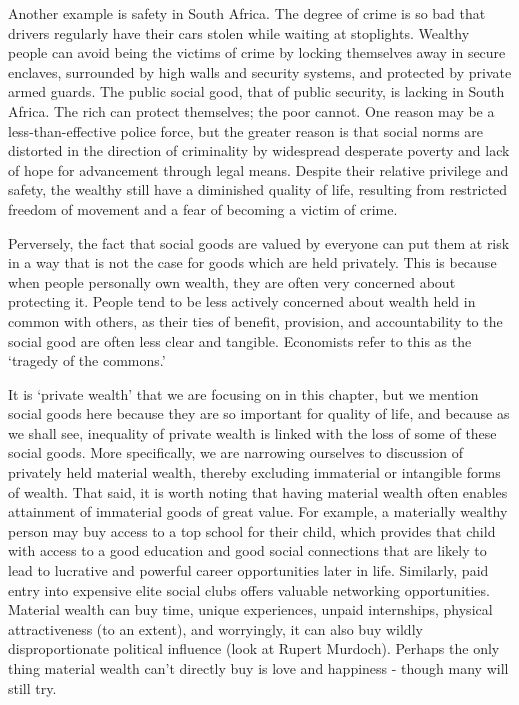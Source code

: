 \documentclass[]{tufte-handout}
\begin{document}
Another example is safety in South Africa. The degree of crime is so bad
that drivers regularly have their cars stolen while waiting at
stoplights. Wealthy people can avoid being the victims of crime by
locking themselves away in secure enclaves, surrounded by high walls and
security systems, and protected by private armed guards. The public
social good, that of public security, is lacking in South Africa. The
rich can protect themselves; the poor cannot. One reason may be a
less-than-effective police force, but the greater reason is that social
norms are distorted in the direction of criminality by widespread
desperate poverty and lack of hope for advancement through legal means.
Despite their relative privilege and safety, the wealthy still have a
diminished quality of life, resulting from restricted freedom of
movement and a fear of becoming a victim of crime.

Perversely, the fact that social goods are valued by everyone can put
them at risk in a way that is not the case for goods which are held
privately. This is because when people personally own wealth, they are
often very concerned about protecting it. People tend to be less
actively concerned about wealth held in common with others, as their
ties of benefit, provision, and accountability to the social good are
often less clear and tangible. Economists refer to this as the `tragedy
of the commons.'

It is `private wealth' that we are focusing on in this chapter, but we
mention social goods here because they are so important for quality of
life, and because as we shall see, inequality of private wealth is
linked with the loss of some of these social goods. More specifically,
we are narrowing ourselves to discussion of privately held material
wealth, thereby excluding immaterial or intangible forms of wealth. That
said, it is worth noting that having material wealth often enables
attainment of immaterial goods of great value. For example, a materially
wealthy person may buy access to a top school for their child, which
provides that child with access to a good education and good social
connections that are likely to lead to lucrative and powerful career
opportunities later in life. Similarly, paid entry into expensive elite
social clubs offers valuable networking opportunities. Material wealth
can buy time, unique experiences, unpaid internships, physical
attractiveness (to an extent), and worryingly, it can also buy wildly
disproportionate political influence (look at Rupert Murdoch). Perhaps
the only thing material wealth can't directly buy is love and happiness
- though many will still try.
\end{document}
